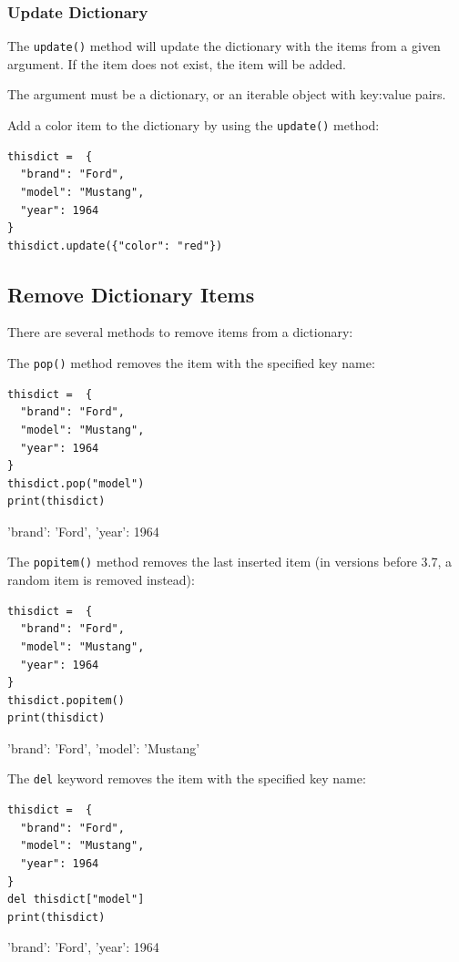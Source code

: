 \documentclass[12pt,a4paper]{article}
\newcommand{\code}[1]{%
	\colorbox{backcolour}{\lstinline{#1}}%
}
\newcommand{\lcode}[1]{%
	\lstinline{#1}%
}
\begin{document}
\subsubsection{Update Dictionary}

The \code{update()} method will update the dictionary with the items from a
given argument. If the item does not exist, the item will be added.

The argument must be a dictionary, or an iterable object with key:value pairs.

\begin{ebox}
Add a color item to the dictionary by using the \lcode{update()} method:
	\begin{lstlisting}
thisdict =	{
  "brand": "Ford",
  "model": "Mustang",
  "year": 1964
}
thisdict.update({"color": "red"})
	\end{lstlisting}
\end{ebox}
\subsection{Remove Dictionary Items}

There are several methods to remove items from a dictionary:

\begin{ebox}
The \lcode{pop()} method removes the item with the specified key name:
	\begin{lstlisting}
thisdict =	{
  "brand": "Ford",
  "model": "Mustang",
  "year": 1964
}
thisdict.pop("model")
print(thisdict)
	\end{lstlisting}
\tcblower
	\begin{vercode}
{'brand': 'Ford', 'year': 1964}
	\end{vercode}
\end{ebox}

\begin{ebox}
The \lcode{popitem()} method removes the last inserted item (in versions before
3.7, a random item is removed instead):
	\begin{lstlisting}
thisdict =	{
  "brand": "Ford",
  "model": "Mustang",
  "year": 1964
}
thisdict.popitem()
print(thisdict)
	\end{lstlisting}
\tcblower
	\begin{vercode}
{'brand': 'Ford', 'model': 'Mustang'}
	\end{vercode}
\end{ebox}

\begin{ebox}
The \lcode{del} keyword removes the item with the specified key name:
	\begin{lstlisting}
thisdict =	{
  "brand": "Ford",
  "model": "Mustang",
  "year": 1964
}
del thisdict["model"]
print(thisdict) 
	\end{lstlisting}
\tcblower
	\begin{vercode}
{'brand': 'Ford', 'year': 1964}
	\end{vercode}
\end{ebox}
\end{document}
